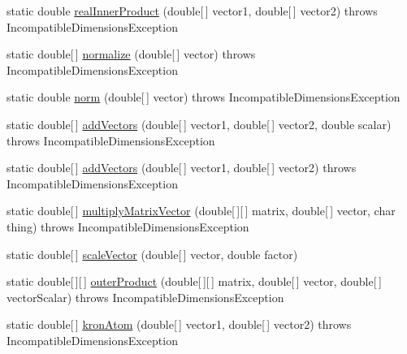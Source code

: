 \begin{DoxyCompactItemize}
\item 
static double \hyperlink{classOMP2D_1_1MatrixOperations_a0ffd0bed3beb6b14b1e6c80259fdb2fc}{real\-Inner\-Product} (double\mbox{[}$\,$\mbox{]} vector1, double\mbox{[}$\,$\mbox{]} vector2)  throws Incompatible\-Dimensions\-Exception 
\item 
static double\mbox{[}$\,$\mbox{]} \hyperlink{classOMP2D_1_1MatrixOperations_a435ecf7d2a5c1dff9f70ef542b17804b}{normalize} (double\mbox{[}$\,$\mbox{]} vector)  throws Incompatible\-Dimensions\-Exception 
\item 
static double \hyperlink{classOMP2D_1_1MatrixOperations_ad4e2f7e46255b1af0dc78b06151ce0a1}{norm} (double\mbox{[}$\,$\mbox{]} vector)  throws Incompatible\-Dimensions\-Exception 
\item 
static double\mbox{[}$\,$\mbox{]} \hyperlink{classOMP2D_1_1MatrixOperations_a4fbee19c7844db28af5203a2b6087206}{add\-Vectors} (double\mbox{[}$\,$\mbox{]} vector1, double\mbox{[}$\,$\mbox{]} vector2, double scalar)  throws Incompatible\-Dimensions\-Exception 
\item 
static double\mbox{[}$\,$\mbox{]} \hyperlink{classOMP2D_1_1MatrixOperations_aaeb17605f361eadab3ffb12918d24496}{add\-Vectors} (double\mbox{[}$\,$\mbox{]} vector1, double\mbox{[}$\,$\mbox{]} vector2)  throws Incompatible\-Dimensions\-Exception 
\item 
static double\mbox{[}$\,$\mbox{]} \hyperlink{classOMP2D_1_1MatrixOperations_aaa1507cc4bd3d390fea146ab29abb5bf}{multiply\-Matrix\-Vector} (double\mbox{[}$\,$\mbox{]}\mbox{[}$\,$\mbox{]} matrix, double\mbox{[}$\,$\mbox{]} vector, char thing)  throws Incompatible\-Dimensions\-Exception 
\item 
static double\mbox{[}$\,$\mbox{]} \hyperlink{classOMP2D_1_1MatrixOperations_af63d77a6ef1d2bae746c7f47099f01ed}{scale\-Vector} (double\mbox{[}$\,$\mbox{]} vector, double factor)
\item 
static double\mbox{[}$\,$\mbox{]}\mbox{[}$\,$\mbox{]} \hyperlink{classOMP2D_1_1MatrixOperations_a3f7a1739a39b7bc42567c8011694bb5f}{outer\-Product} (double\mbox{[}$\,$\mbox{]}\mbox{[}$\,$\mbox{]} matrix, double\mbox{[}$\,$\mbox{]} vector, double\mbox{[}$\,$\mbox{]} vector\-Scalar)  throws Incompatible\-Dimensions\-Exception 
\item 
static double\mbox{[}$\,$\mbox{]} \hyperlink{classOMP2D_1_1MatrixOperations_aee29169db5db03e194c041f89399b35c}{kron\-Atom} (double\mbox{[}$\,$\mbox{]} vector1, double\mbox{[}$\,$\mbox{]} vector2)  throws Incompatible\-Dimensions\-Exception 

\end{DoxyCompactItemize}
